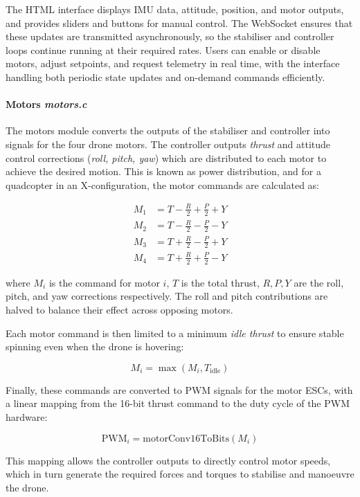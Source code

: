 The HTML interface displays IMU data, attitude, position, and motor outputs, and provides sliders and buttons for manual control. The WebSocket ensures that these updates are transmitted asynchronously, so the stabiliser and controller loops continue running at their required rates. Users can enable or disable motors, adjust setpoints, and request telemetry in real time, with the interface handling both periodic state updates and on-demand commands efficiently.

\temp{[Image]}

\paragraph{\textbf{Motors} \textit{motors.c}} \leavevmode

The motors module converts the outputs of the stabiliser and controller into signals for the four drone motors. The controller outputs \textit{thrust} and attitude control corrections (\textit{roll, pitch, yaw}) which are distributed to each motor to achieve the desired motion. This is known as power distribution, and for a quadcopter in an X-configuration, the motor commands are calculated as:

\[
\begin{aligned}
M_1 &= T - \frac{R}{2} + \frac{P}{2} + Y \\
M_2 &= T - \frac{R}{2} - \frac{P}{2} - Y \\
M_3 &= T + \frac{R}{2} - \frac{P}{2} + Y \\
M_4 &= T + \frac{R}{2} + \frac{P}{2} - Y
\end{aligned}
\]

where \(M_i\) is the command for motor \(i\), \(T\) is the total thrust, \(R, P, Y\) are the roll, pitch, and yaw corrections respectively. The roll and pitch contributions are halved to balance their effect across opposing motors.  

Each motor command is then limited to a minimum \textit{idle thrust} to ensure stable spinning even when the drone is hovering:

\[
M_i = \max(M_i, T_\text{idle})
\]

Finally, these commands are converted to PWM signals for the motor ESCs, with a linear mapping from the 16-bit thrust command to the duty cycle of the PWM hardware:

\[
\text{PWM}_{i} = \text{motorConv16ToBits}(M_i)
\]

This mapping allows the controller outputs to directly control motor speeds, which in turn generate the required forces and torques to stabilise and manoeuvre the drone.

